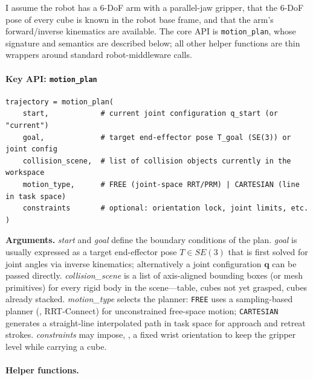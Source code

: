\documentclass{article}
\begin{document}
I assume the robot has a 6-DoF arm with a parallel-jaw gripper, that the 6-DoF pose of every cube is known in the robot base frame, and that the arm's forward/inverse kinematics are available.
The core API is \texttt{motion\_plan}, whose signature and semantics are described below; all other helper functions are thin wrappers around standard robot-middleware calls.

\paragraph{Key API: \texttt{motion\_plan}}
\begin{verbatim}
trajectory = motion_plan(
    start,            # current joint configuration q_start (or "current")
    goal,             # target end-effector pose T_goal (SE(3)) or joint config
    collision_scene,  # list of collision objects currently in the workspace
    motion_type,      # FREE (joint-space RRT/PRM) | CARTESIAN (line in task space)
    constraints       # optional: orientation lock, joint limits, etc.
)
\end{verbatim}

\noindent\textbf{Arguments.}
\textit{start} and \textit{goal} define the boundary conditions of the plan.
\textit{goal} is usually expressed as a target end-effector pose $T \in SE(3)$ that is first solved for joint angles via inverse kinematics; alternatively a joint configuration $\mathbf{q}$ can be passed directly.
\textit{collision\_scene} is a list of axis-aligned bounding boxes (or mesh primitives) for every rigid body in the scene---table, cubes not yet grasped, cubes already stacked.
\textit{motion\_type} selects the planner: \texttt{FREE} uses a sampling-based planner (\eg, RRT-Connect) for unconstrained free-space motion; \texttt{CARTESIAN} generates a straight-line interpolated path in task space for approach and retreat strokes.
\textit{constraints} may impose, \eg, a fixed wrist orientation to keep the gripper level while carrying a cube.

\paragraph{Helper functions.}
\end{document}
